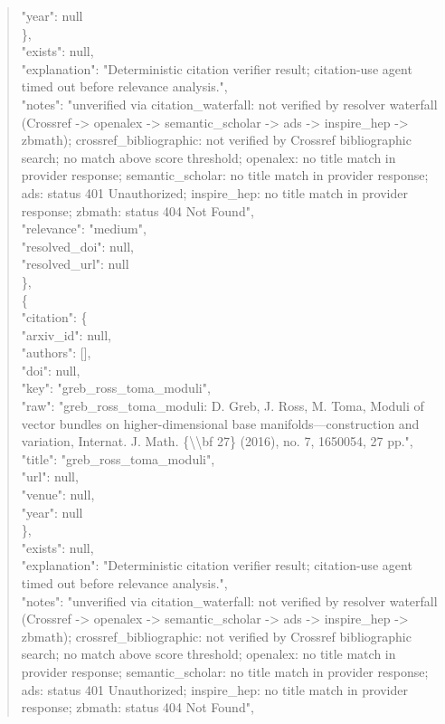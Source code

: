 \documentclass[11pt]{article}
\begin{document}
\begin{quote}
        "year": null\\
      \},\\
      "exists": null,\\
      "explanation": "Deterministic citation verifier result; citation-use agent timed out before relevance analysis.",\\
      "notes": "unverified via citation\_waterfall: not verified by resolver waterfall (Crossref -> openalex -> semantic\_scholar -> ads -> inspire\_hep -> zbmath); crossref\_bibliographic: not verified by Crossref bibliographic search; no match above score threshold; openalex: no title match in provider response; semantic\_scholar: no title match in provider response; ads: status 401 Unauthorized; inspire\_hep: no title match in provider response; zbmath: status 404 Not Found",\\
      "relevance": "medium",\\
      "resolved\_doi": null,\\
      "resolved\_url": null\\
    \},\\
    \{\\
      "citation": \{\\
        "arxiv\_id": null,\\
        "authors": [],\\
        "doi": null,\\
        "key": "greb\_ross\_toma\_moduli",\\
        "raw": "greb\_ross\_toma\_moduli: D. Greb, J. Ross, M. Toma, Moduli of vector bundles on higher-dimensional base manifolds---construction and variation, Internat. J. Math. \{\textbackslash{}\textbackslash{}bf 27\} (2016), no. 7, 1650054, 27 pp.",\\
        "title": "greb\_ross\_toma\_moduli",\\
        "url": null,\\
        "venue": null,\\
        "year": null\\
      \},\\
      "exists": null,\\
      "explanation": "Deterministic citation verifier result; citation-use agent timed out before relevance analysis.",\\
      "notes": "unverified via citation\_waterfall: not verified by resolver waterfall (Crossref -> openalex -> semantic\_scholar -> ads -> inspire\_hep -> zbmath); crossref\_bibliographic: not verified by Crossref bibliographic search; no match above score threshold; openalex: no title match in provider response; semantic\_scholar: no title match in provider response; ads: status 401 Unauthorized; inspire\_hep: no title match in provider response; zbmath: status 404 Not Found",\\

\end{quote}
\end{document}
